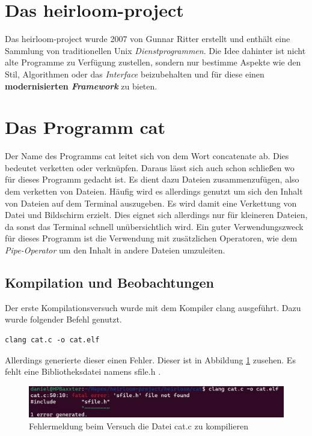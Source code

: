 \section{Das heirloom-project}
Das heirloom-project wurde 2007 von Gunnar Ritter erstellt und enthält eine Sammlung von traditionellen Unix \textit{Dienstprogrammen}. Die Idee dahinter ist nicht alte Programme zu Verfügung zustellen, sondern nur bestimme Aspekte wie den Stil, Algorithmen oder das \textit{Interface} beizubehalten und für diese einen \textbf{modernisierten \textit{Framework}} zu bieten.

\section{Das Programm cat}
Der Name des Programms cat leitet sich von dem Wort concatenate ab. Dies bedeutet verketten oder verknüpfen. Daraus lässt sich auch schon schließen wo für dieses Programm gedacht ist. Es dient dazu Dateien zusammenzufügen, also dem verketten von Dateien. Häufig wird es allerdings genutzt um sich den Inhalt von Dateien auf dem Terminal auszugeben. Es wird damit eine Verkettung von Datei und Bildschirm erzielt. Dies eignet sich allerdings nur für kleineren Dateien, da sonst das Terminal schnell unübersichtlich wird. Ein guter Verwendungszweck für dieses Programm ist die Verwendung mit zusätzlichen Operatoren, wie dem \textit{Pipe-Operator} um den Inhalt in andere Dateien umzuleiten.

\subsection{Kompilation und Beobachtungen}
Der erste Kompilationsversuch wurde mit dem Kompiler clang ausgeführt. Dazu wurde folgender Befehl genutzt.

\begin{lstlisting}
clang cat.c -o cat.elf
\end{lstlisting}

Allerdings generierte dieser einen Fehler. Dieser ist in Abbildung \ref{clang_cat.c_fehler} zusehen. Es fehlt eine Bibliotheksdatei namens sfile.h .

\begin{figure}[h]
	\centering
	\includegraphics[scale=0.5]{Images/1_clang_cat.c.png}
	\caption{Fehlermeldung beim Versuch die Datei cat.c zu kompilieren}
	\label{clang_cat.c_fehler}
\end{figure}

